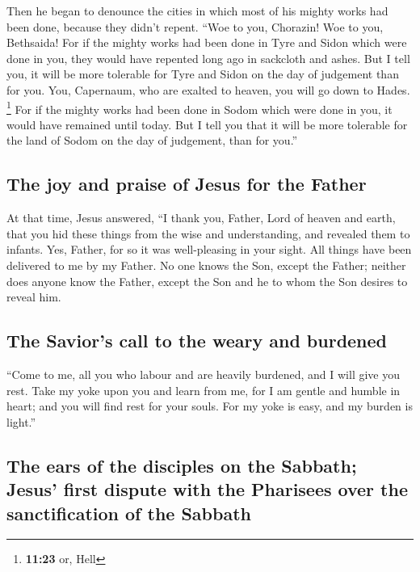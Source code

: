  Then he began to denounce the cities in which most of
his mighty works had been done, because they didn't repent.
 ``Woe to you, Chorazin! Woe to you, Bethsaida! For if
the mighty works had been done in Tyre and Sidon which were done in you,
they would have repented long ago in sackcloth and ashes.
 But I tell you, it will be more tolerable for Tyre and
Sidon on the day of judgement than for you.  You,
Capernaum, who are exalted to heaven, you will go down to Hades.
\footnote{\textbf{11:23} or, Hell} For if the mighty works had been done
in Sodom which were done in you, it would have remained until today.
 But I tell you that it will be more tolerable for the
land of Sodom on the day of judgement, than for you.''

\hypertarget{the-joy-and-praise-of-jesus-for-the-father}{%
\subsection{The joy and praise of Jesus for the
Father}\label{the-joy-and-praise-of-jesus-for-the-father}}

 At that time, Jesus answered, ``I thank you, Father,
Lord of heaven and earth, that you hid these things from the wise and
understanding, and revealed them to infants.  Yes,
Father, for so it was well-pleasing in your sight.  All
things have been delivered to me by my Father. No one knows the Son,
except the Father; neither does anyone know the Father, except the Son
and he to whom the Son desires to reveal him.

\hypertarget{the-saviors-call-to-the-weary-and-burdened}{%
\subsection{The Savior's call to the weary and
burdened}\label{the-saviors-call-to-the-weary-and-burdened}}

 ``Come to me, all you who labour and are heavily
burdened, and I will give you rest.  Take my yoke upon
you and learn from me, for I am gentle and humble in heart; and you will
find rest for your souls.  For my yoke is easy, and my
burden is light.''

\hypertarget{the-ears-of-the-disciples-on-the-sabbath-jesus-first-dispute-with-the-pharisees-over-the-sanctification-of-the-sabbath}{%
\subsection{The ears of the disciples on the Sabbath; Jesus' first
dispute with the Pharisees over the sanctification of the
Sabbath}\label{the-ears-of-the-disciples-on-the-sabbath-jesus-first-dispute-with-the-pharisees-over-the-sanctification-of-the-sabbath}}

